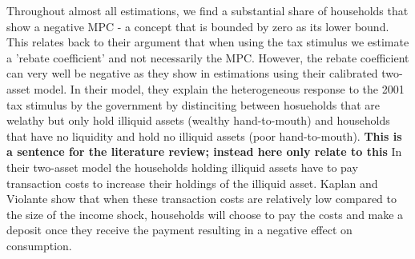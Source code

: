 Throughout almost all estimations, we find a substantial share of households that show a negative MPC - a concept that is bounded by zero as its lower bound. This relates back to their argument that when using the tax stimulus we estimate a 'rebate coefficient' and not necessarily the MPC. However, the rebate coefficient can very well be negative as they show in estimations using their calibrated two-asset model. In their model, they explain the heterogeneous response to the 2001 tax stimulus by the government by distinciting between hosueholds that are welathy but only hold illiquid assets (wealthy hand-to-mouth) and households that have no liquidity and hold no illiquid assets (poor hand-to-mouth). \textbf{This is a sentence for the literature review; instead here only relate to this} In their two-asset model the households holding illiquid assets have to pay transaction costs to increase their holdings of the illiquid asset. Kaplan and Violante show that when these transaction costs are relatively low compared to the size of the income shock, households will choose to pay the costs and make a deposit once they receive the payment resulting in a negative effect on consumption. 